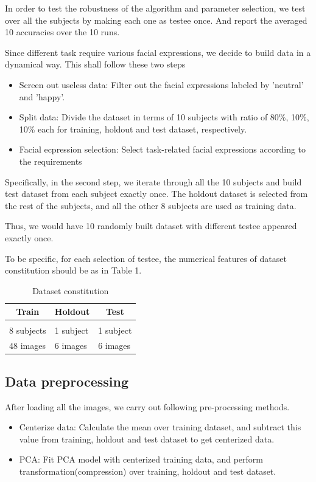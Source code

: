 \documentclass{article} %
\begin{document}
In order to test the robustness of the algorithm and parameter selection, we test over all the subjects by making each one
as testee once. And report the averaged 10 accuracies over the 10 runs.

Since different task require various facial expressions, we decide to build data in a dynamical way.
This shall follow these two steps
\begin{itemize}
    \item Screen out useless data: Filter out the facial expressions labeled by 'neutral' and 'happy'.
    \item Split data: Divide the dataset in terms of 10 subjects with ratio of 80\%, 10\%, 10\% each for training, holdout and test dataset, respectively.
    \item Facial ecpression selection: Select task-related facial expressions according to the requirements
\end{itemize}

Specifically, in the second step, we iterate through all the 10 subjects and build test dataset from each subject exactly once.
The holdout dataset is selected from the rest of the subjects, and all the other 8 subjects are used as training data.

Thus, we would have 10 randomly built dataset with different testee appeared exactly once.

To be specific, for each selection of testee, the numerical features of dataset constitution should be as in Table 1.

\begin{table}[htb]
    \caption{Dataset constitution}
    \label{evaluation-of-f}
    \begin{center}
    \begin{tabular}{lll}
    \multicolumn{1}{c}{\bf Train}  &\multicolumn{1}{c}{\bf Holdout} &\multicolumn{1}{c}{\bf Test}
    \\ \hline \\
    8 subjects & 1 subject & 1 subject \\
    48 images & 6 images & 6 images \\
    \end{tabular}
    \end{center}
    \end{table}

\subsection{Data preprocessing}
After loading all the images, we carry out following pre-processing methods.
\begin{itemize}
    \item Centerize data: Calculate the mean over training dataset, and subtract this value from training, holdout and test dataset to get centerized data.
    \item PCA: Fit PCA model with centerized training data, and perform transformation(compression) over training, holdout and test dataset.
\end{itemize}
\end{document}
